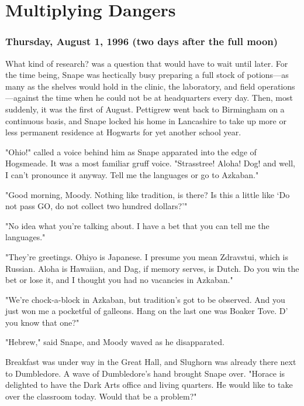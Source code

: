 
\chapter{Multiplying Dangers}

\subsection{Thursday, August 1, 1996 (two days after the full moon)}

What kind of research? was a question that would have to wait until later. For the time being, Snape was hectically busy preparing a full stock of potions—as many as the shelves would hold in the clinic, the laboratory, and field operations—against the time when he could not be at headquarters every day. Then, most suddenly, it was the first of August. Pettigrew went back to Birmingham on a continuous basis, and Snape locked his home in Lancashire to take up more or less permanent residence at Hogwarts for yet another school year.

"Ohio!" called a voice behind him as Snape apparated into the edge of Hogsmeade. It was a most familiar gruff voice. "Strasstree! Aloha! Dog! and{\el} well, I can't pronounce it anyway. Tell me the languages or go to Azkaban."

"Good morning, Moody. Nothing like tradition, is there? Is this a little like `Do not pass GO, do not collect two hundred dollars?'"

"No idea what you're talking about. I have a bet that you can tell me the languages."

"They're greetings. Ohiyo is Japanese. I presume you mean Zdravstui, which is Russian. Aloha is Hawaiian, and Dag, if memory serves, is Dutch. Do you win the bet or lose it, and I thought you had no vacancies in Azkaban."

"We're chock-a-block in Azkaban, but tradition's got to be observed. And you just won me a pocketful of galleons. Hang on{\el} the last one was Boaker Tove. D' you know that one?"

"Hebrew," said Snape, and Moody waved as he disapparated.

Breakfast was under way in the Great Hall, and Slughorn was already there next to Dumbledore. A wave of Dumbledore's hand brought Snape over. "Horace is delighted to have the Dark Arts office and living quarters. He would like to take over the classroom today. Would that be a problem?"


